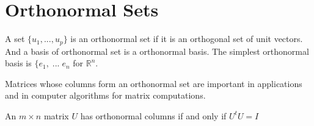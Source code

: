 \documentclass[aima104_lecturenotes_ku.tex]{subfiles}
\begin{document}
\section{Orthonormal Sets}
A set $\{u_1, ..., u_p\}$ is an orthonormal set if it is an orthogonal set of unit vectors. And a basis of orthonormal set is a orthonormal basis. The simplest orthonormal basis is $\{e_1, \; ...\; e_n$ for $\mathbb{R}^n$.

Matrices whose columns form an orthonormal set are important in applications and in computer algorithms for matrix computations.

\begin{theorem}
  An $m \times n$ matrix $U$ has orthonormal columns if and only if $U^tU=I$
\end{theorem}
\end{document}
